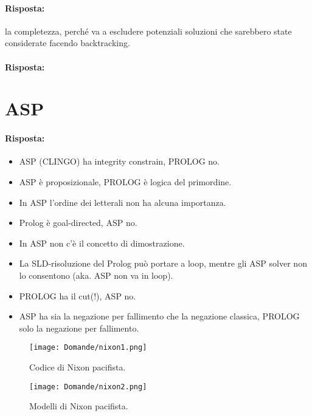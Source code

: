 \paragraph{Risposta:} la completezza, perché va a escludere potenziali soluzioni che sarebbero state considerate facendo backtracking.


\paragraph{Risposta:}

\section{ASP}




\paragraph{Risposta:}

\begin{itemize}
  \item ASP (CLINGO) ha integrity constrain, PROLOG no.
  \item ASP è proposizionale, PROLOG è logica del primordine. 
\item In ASP l’ordine dei letterali non ha alcuna importanza. 
  \item Prolog è goal-directed, ASP no.
  \item In ASP non c'è il concetto di dimostrazione.
  \item La SLD-risoluzione del Prolog può portare a loop,
mentre gli ASP solver non lo consentono (aka. ASP non va in loop). 
\item PROLOG ha il cut(!), ASP no.
\item ASP ha sia la negazione per fallimento che la negazione classica, PROLOG solo la negazione per fallimento.
\end{itemize}


\begin{figure}[h]
    \centering
    \begin{minipage}{0.45\textwidth}
        \centering
        \texttt{[image: Domande/nixon1.png]}
        \caption{Codice di Nixon pacifista.}
    \end{minipage}
    \hfill
    \begin{minipage}{0.45\textwidth}
        \centering
        \texttt{[image: Domande/nixon2.png]}
        \caption{Modelli di Nixon pacifista.}
    \end{minipage}
\end{figure}


